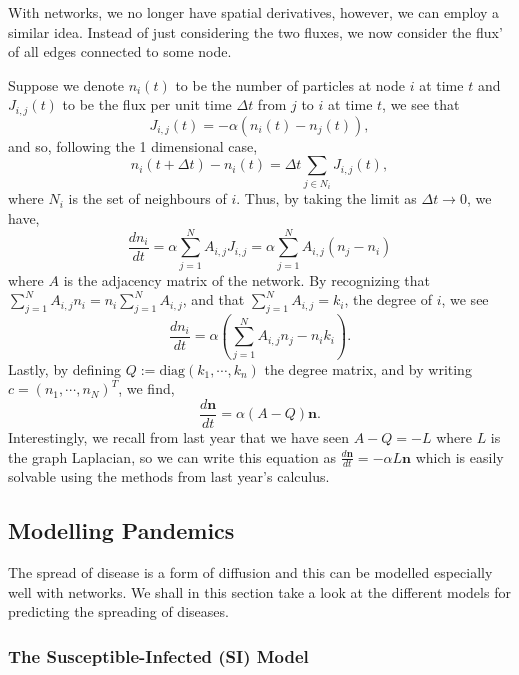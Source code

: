 \documentclass[
]{article}
\theoremstyle{definition}
\begin{document}
With networks, we no longer have spatial derivatives, however, we can
employ a similar idea. Instead of just considering the two fluxes, we
now consider the flux' of all edges connected to some node.

Suppose we denote \(n_i(t)\) to be the number of particles at node \(i\)
at time \(t\) and \(J_{i,j}(t)\) to be the flux per unit time
\(\Delta t\) from \(j\) to \(i\) at time \(t\), we see that
\[J_{i, j}(t) = -\alpha(n_i(t) - n_j(t)),\] and so, following the 1
dimensional case,
\[n_i(t + \Delta t) - n_i(t) = \Delta t \sum_{j \in N_i} J_{i, j}(t),\]
where \(N_i\) is the set of neighbours of \(i\). Thus, by taking the
limit as \(\Delta t \to 0\), we have, \begin{equation}
  \frac{dn_i}{dt} = \alpha \sum_{j = 1}^N A_{i, j} J_{i, j} = 
  \alpha \sum_{j = 1}^N A_{i, j}(n_j - n_i)
\end{equation} where \(A\) is the adjacency matrix of the network. By
recognizing that
\(\sum_{j = 1}^N A_{i, j}n_i = n_i \sum_{j = 1}^N A_{i, j}\), and that
\(\sum_{j = 1}^N A_{i, j} = k_i\), the degree of \(i\), we see
\begin{equation}
  \frac{dn_i}{dt} = \alpha (\sum_{j = 1}^N A_{i, j} n_j - n_i k_i).
\end{equation} Lastly, by defining
\(Q := \text{diag}(k_1, \cdots, k_n)\) the degree matrix, and by writing
\(c = (n_1, \cdots, n_N)^T\), we find, \begin{equation}
  \frac{d\mathbf{n}}{dt} = \alpha (A - Q)\mathbf{n}.
\end{equation} Interestingly, we recall from last year that we have seen
\(A - Q = -L\) where \(L\) is the graph Laplacian, so we can write this
equation as \(\frac{d\mathbf{n}}{dt} = -\alpha L \mathbf{n}\) which is
easily solvable using the methods from last year's calculus.

\hypertarget{modelling-pandemics}{%
\subsection{Modelling Pandemics}\label{modelling-pandemics}}

The spread of disease is a form of diffusion and this can be modelled
especially well with networks. We shall in this section take a look at
the different models for predicting the spreading of diseases.

\hypertarget{the-susceptible-infected-si-model}{%
\subsubsection{The Susceptible-Infected (SI)
Model}\label{the-susceptible-infected-si-model}}
\end{document}
